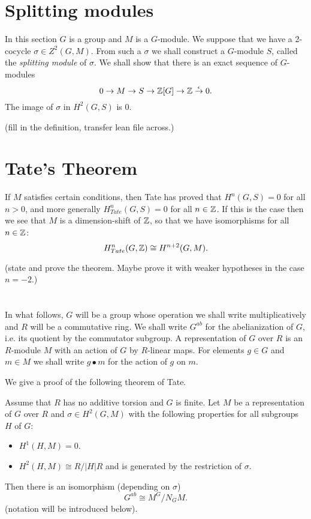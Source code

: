 \section{Splitting modules}

In this section $G$ is a group and $M$ is a $G$-module.
We suppose that we have a 2-cocycle $\sigma \in Z^2(G,M)$.
From such a $\sigma$ we shall construct a $G$-module $S$, called the \emph{splitting module} of
$\sigma$.
We shall show that there is an exact sequence of $G$-modules
\[
  0 \to M \to S \to {\mathbb Z}[G] \to {\mathbb Z} \stackrel{\epsilon}\to 0.
\]
The image of $\sigma$ in $H^2(G,S)$ is $0$.

(fill in the definition, transfer lean file across.)


\section{Tate's Theorem}

If $M$ satisfies certain conditions, then Tate has proved that $H^n(G,S)=0$ for all $n>0$,
and more generally $H^n_{Tate}(G,S)=0$ for all $n \in {\mathbb Z}$.
If this is the case then we see that $M$ is a dimension-shift of ${\mathbb Z}$, so that we have
isomorphisms for all $n \in {\mathbb Z}$:
\[
  H^n_{Tate}(G,{\mathbb Z}) \cong H^{n+2}(G,M).
\]

(state and prove the theorem. Maybe prove it with weaker hypotheses in the case $n=-2$.)


\newpage
\section{}



In what follows, $G$ will be a group whose operation we shall write multiplicatively
and $R$ will be a commutative ring.
We shall write $G^{ab}$ for the abelianization of $G$, i.e. its quotient by the commutator subgroup.
A representation of $G$ over $R$ is an $R$-module $M$ with an action of $G$ by $R$-linear maps.
For elements $g \in G$ and $m \in M$ we shall write $g \bullet m$ for the action of $g$ on $m$.

We give a proof of the following theorem of Tate.

\begin{theorem}
	Assume that $R$ has no additive torsion and $G$ is finite.
	Let $M$ be a representation of $G$ over $R$ and $\sigma \in H^2(G,M)$ with the following properties for all subgroups $H$ of $G$:
	\begin{itemize}
		\item
		$H^1(H,M)=0$.
		\item
		$H^2(H,M) \cong R / |H| R$ and is generated by the restriction of $\sigma$.
	\end{itemize}
	Then there is an isomorphism (depending on $\sigma$)
	\[
		G^{ab}
		\cong
		M^G / N_G M.
	\]
	(notation will be introduced below).
\end{theorem}

